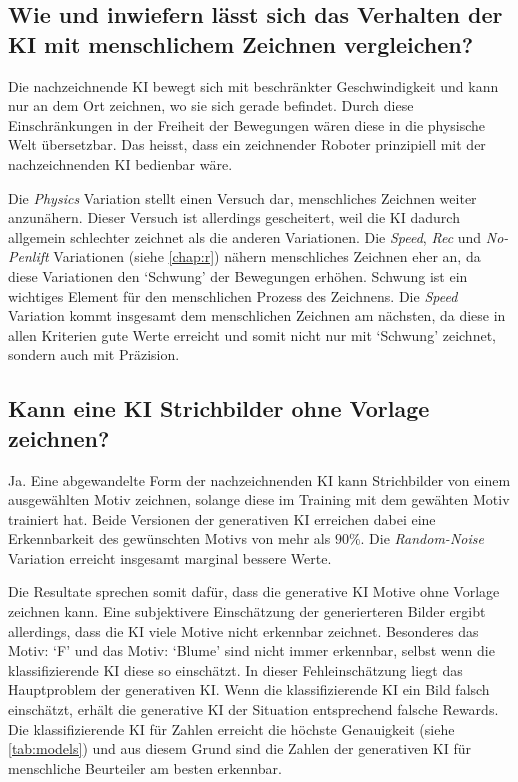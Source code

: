 \subsection{Wie und inwiefern lässt sich das Verhalten der KI mit menschlichem Zeichnen vergleichen?}\label{subsub:d_frage_unter_5}

Die nachzeichnende KI bewegt sich mit beschränkter Geschwindigkeit und kann nur
an dem Ort zeichnen, wo sie sich gerade befindet. Durch diese Einschränkungen in
der Freiheit der Bewegungen wären diese in die physische Welt übersetzbar.  Das
heisst, dass ein zeichnender Roboter prinzipiell mit der nachzeichnenden KI
bedienbar wäre.

Die \emph{Physics} Variation stellt einen Versuch dar, menschliches Zeichnen
weiter anzunähern. Dieser Versuch ist allerdings gescheitert, weil die KI
dadurch allgemein schlechter zeichnet als die anderen Variationen. Die
\emph{Speed}, \emph{Rec} und \emph{No-Penlift} Variationen (siehe
\ref{chap:r}) nähern menschliches Zeichnen eher an, da diese Variationen
den `Schwung' der Bewegungen erhöhen. Schwung ist ein wichtiges Element für den
menschlichen Prozess des Zeichnens. Die \emph{Speed} Variation kommt insgesamt
dem menschlichen Zeichnen am nächsten, da diese in allen Kriterien gute Werte
erreicht und somit nicht nur mit `Schwung' zeichnet, sondern auch mit Präzision.


\subsection{Kann eine KI Strichbilder ohne Vorlage
zeichnen?}\label{subsub:d_frage_unter_6} Ja. Eine abgewandelte Form der
nachzeichnenden KI kann Strichbilder von einem ausgewählten Motiv zeichnen,
solange diese im Training mit dem gewähten Motiv trainiert hat. Beide Versionen der
generativen KI erreichen dabei eine Erkennbarkeit des gewünschten Motivs von
mehr als $90\%$. Die \emph{Random-Noise} Variation erreicht insgesamt marginal bessere
Werte.

Die Resultate sprechen somit dafür, dass die generative KI Motive ohne Vorlage
zeichnen kann. Eine subjektivere Einschätzung der generierteren Bilder ergibt
allerdings, dass die KI viele Motive nicht erkennbar zeichnet. Besonderes das
Motiv: `F' und das Motiv: `Blume' sind nicht immer erkennbar, selbst wenn die
klassifizierende KI diese so einschätzt. In dieser Fehleinschätzung liegt das
Hauptproblem der generativen KI. Wenn die klassifizierende KI ein Bild falsch
einschätzt, erhält die generative KI der Situation entsprechend falsche Rewards.
Die klassifizierende KI für Zahlen erreicht die höchste Genauigkeit (siehe
\ref{tab:models}) und aus diesem Grund sind die Zahlen der generativen KI für
menschliche Beurteiler am besten erkennbar.

